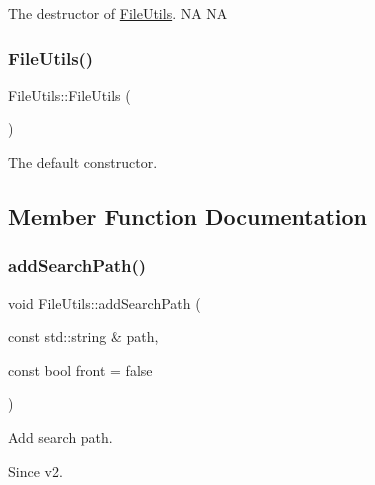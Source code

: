 The destructor of \hyperlink{classFileUtils}{File\+Utils}.  NA  NA \mbox{\label{classFileUtils_abb87f1bbabb1164634e428aee3559b10}} 
\subsubsection{\texorpdfstring{File\+Utils()}{FileUtils()}\hspace{0.1cm}{\footnotesize\ttfamily [2/2]}}
{\footnotesize\ttfamily File\+Utils\+::\+File\+Utils (\begin{DoxyParamCaption}{ }\end{DoxyParamCaption})\hspace{0.3cm}{\ttfamily [protected]}}

The default constructor. 

\subsection{Member Function Documentation}
\mbox{\label{classFileUtils_a690dab9554f2976e2d5ae0a6322e245d}} 
\subsubsection{\texorpdfstring{add\+Search\+Path()}{addSearchPath()}\hspace{0.1cm}{\footnotesize\ttfamily [1/2]}}
{\footnotesize\ttfamily void File\+Utils\+::add\+Search\+Path (\begin{DoxyParamCaption}\item[{const std\+::string \&}]{path,  }\item[{const bool}]{front = {\ttfamily false} }\end{DoxyParamCaption})}

Add search path.

\begin{DoxySince}{Since}
v2. 
\end{DoxySince}
\mbox{\label{classFileUtils_a690dab9554f2976e2d5ae0a6322e245d}} 
